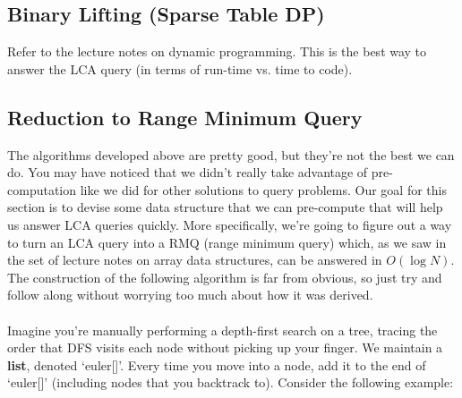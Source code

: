 \documentclass[11pt]{article}
\theoremstyle{plain}
\theoremstyle{definition}
\begin{document}
\subsection{Binary Lifting (Sparse Table DP)}
Refer to the lecture notes on dynamic programming. This is the best way to answer the LCA query (in terms of run-time vs. time to code).
\subsection{Reduction to Range Minimum Query}
The algorithms developed above are pretty good, but they're not the best we can do. You may have noticed that we didn't really take advantage of pre-computation like we did for other solutions to query problems. Our goal for this section is to devise some data structure that we can pre-compute that will help us answer LCA queries quickly. More specifically, we're going to figure out a way to turn an LCA query into a RMQ (range minimum query) which, as we saw in the set of lecture notes on array data structures, can be answered in $O(\log{N})$. The construction of the following algorithm is far from obvious, so just try and follow along without worrying too much about how it was derived.
\\\\
\noindent
Imagine you're manually performing a depth-first search on a tree, tracing the order that DFS visits each node without picking up your finger. We maintain a {\bf{list}}, denoted `euler[]'. Every time you move into a node, add it to the end of `euler[]' (including nodes that you backtrack to). Consider the following example:
\end{document}
